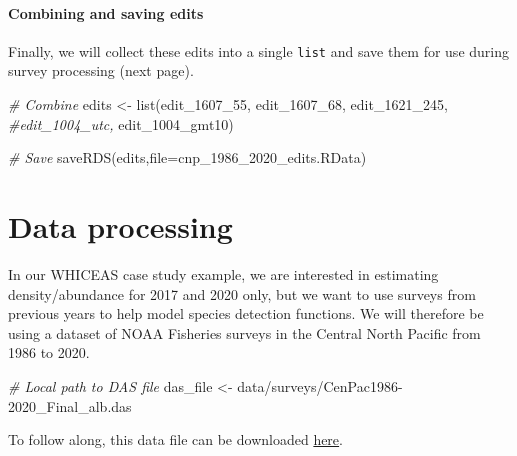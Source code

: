 \documentclass[
]{book}
\newenvironment{Shaded}{\begin{snugshade}}{\end{snugshade}}
\newcommand{\AttributeTok}[1]{\textcolor[rgb]{0.77,0.63,0.00}{#1}}
\newcommand{\CommentTok}[1]{\textcolor[rgb]{0.56,0.35,0.01}{\textit{#1}}}
\newcommand{\FunctionTok}[1]{\textcolor[rgb]{0.00,0.00,0.00}{#1}}
\newcommand{\NormalTok}[1]{#1}
\newcommand{\OtherTok}[1]{\textcolor[rgb]{0.56,0.35,0.01}{#1}}
\newcommand{\StringTok}[1]{\textcolor[rgb]{0.31,0.60,0.02}{#1}}
\begin{document}
\hypertarget{combining-and-saving-edits}{%
\subsubsection*{Combining and saving edits}\label{combining-and-saving-edits}}

Finally, we will collect these edits into a single \texttt{list} and save them for use during survey processing (next page).

\begin{Shaded}
\begin{Highlighting}[]
\CommentTok{\# Combine}
\NormalTok{edits }\OtherTok{\textless{}{-}} \FunctionTok{list}\NormalTok{(edit\_1607\_55,}
\NormalTok{              edit\_1607\_68,}
\NormalTok{              edit\_1621\_245,}
              \CommentTok{\#edit\_1004\_utc,}
\NormalTok{              edit\_1004\_gmt10)}

\CommentTok{\# Save}
\FunctionTok{saveRDS}\NormalTok{(edits,}\AttributeTok{file=}\StringTok{\textquotesingle{}cnp\_1986\_2020\_edits.RData\textquotesingle{}}\NormalTok{)}
\end{Highlighting}
\end{Shaded}

\hypertarget{processing}{%
\chapter{Data processing}\label{processing}}

In our WHICEAS case study example, we are interested in estimating density/abundance for 2017 and 2020 only, but we want to use surveys from previous years to help model species detection functions. We will therefore be using a dataset of NOAA Fisheries surveys in the Central North Pacific from 1986 to 2020.

\begin{Shaded}
\begin{Highlighting}[]
\CommentTok{\# Local path to DAS file}
\NormalTok{das\_file }\OtherTok{\textless{}{-}} \StringTok{\textquotesingle{}data/surveys/CenPac1986{-}2020\_Final\_alb.das\textquotesingle{}}
\end{Highlighting}
\end{Shaded}

To follow along, this data file can be downloaded \href{https://raw.githubusercontent.com/emk-noaa/LTAvignette/main/data/surveys/CenPac1986-2020_Final_alb.das?token=GHSAT0AAAAAACFPESQVLR7DOE4I3UD4UJ2YZGRILEQ}{here}.
\end{document}
